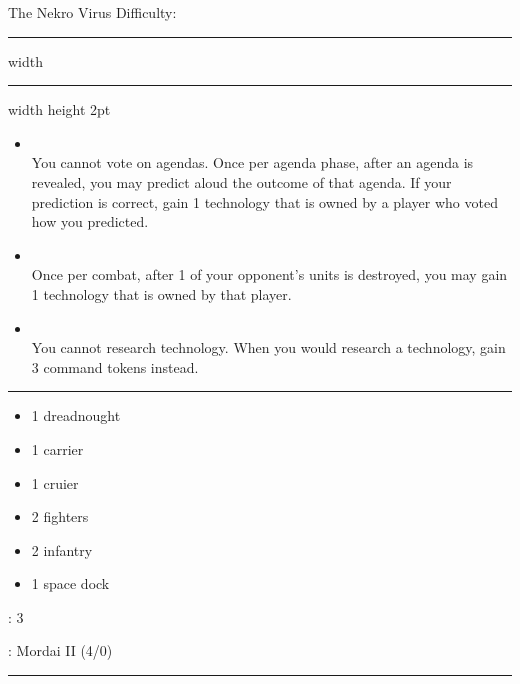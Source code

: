 {\handel\Huge The Nekro Virus} \hfill {\Large Difficulty: \hard} \vspace{-4pt}\\
\hrule width \hsize \kern 1mm \hrule width \hsize height 2pt


\begin{multicols}{2}


\begin{itemize}
\item {}\\
You cannot vote on agendas. Once per agenda phase, after an agenda is revealed, you may predict aloud the outcome of that agenda. If your prediction is correct, gain 1 technology that is owned by a player who voted how you predicted.
\item {}\\
Once per combat, after 1 of your opponent's units is destroyed, you may gain 1 technology that is owned by that player.
\item {}\\
You cannot research technology. When you would research a technology, gain 3 command tokens instead.
\end{itemize}


\vspace{-10pt}\rule{\hsize}{0.4pt}\vspace{5pt}


\vspace{-5pt}
\begin{multicols}{2}
\begin{itemize}
\item 1 dreadnought
\item 1 carrier
\item 1 cruier
\item 2 fighters
\item 2 infantry
\item 1 space dock
\end{itemize}
\end{multicols}

\vspace{-5pt}
: 3

\vspace{2pt}
: Mordai II (4/0)

\rule{\hsize}{0.4pt}\vspace{5pt}


\end{multicols}

